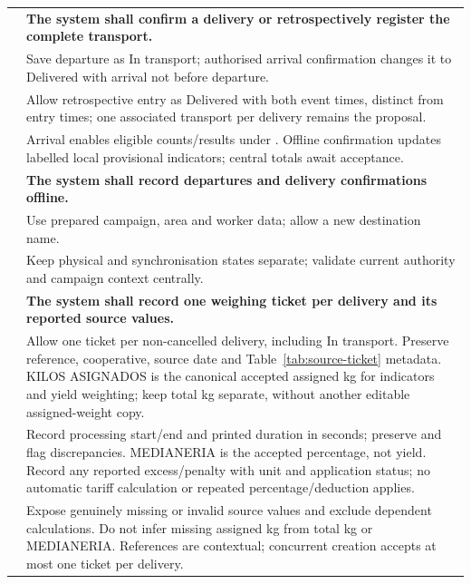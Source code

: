 {\begin{longtable}{L{0.18}L{0.82}}
\midrule
{}
\label{fr:047}\textbf{} & \textbf{The system shall confirm a delivery or retrospectively register the complete transport.}\\*
\label{ac:047:a} & Save departure as In transport; authorised arrival confirmation changes it to Delivered with arrival not before departure.\\
\label{ac:047:b} & Allow retrospective entry as Delivered with both event times, distinct from entry times; one associated transport per delivery remains the proposal.\\
\label{ac:047:c} & Arrival enables eligible counts/results under . Offline confirmation updates labelled local provisional indicators; central totals await acceptance.\\
\midrule
{}
\label{fr:048}\textbf{} & \textbf{The system shall record departures and delivery confirmations offline.}\\*
\label{ac:048:a} & Use prepared campaign, area and worker data; allow a new destination name.\\
\label{ac:048:b} & Keep physical and synchronisation states separate; validate current authority and campaign context centrally.\\
\midrule
{}
\label{fr:049}\textbf{} & \textbf{The system shall record one weighing ticket per delivery and its reported source values.}\\*
\label{ac:049:a} & Allow one ticket per non-cancelled delivery, including In transport. Preserve reference, cooperative, source date and Table~\ref{tab:source-ticket} metadata. KILOS ASIGNADOS is the canonical accepted assigned kg for indicators and yield weighting; keep total kg separate, without another editable assigned-weight copy.\\
\label{ac:049:b} & Record processing start/end and printed duration in seconds; preserve and flag discrepancies. MEDIANERIA is the accepted percentage, not yield. Record any reported excess/penalty with unit and application status; no automatic tariff calculation or repeated percentage/deduction applies.\\
\label{ac:049:c} & Expose genuinely missing or invalid source values and exclude dependent calculations. Do not infer missing assigned kg from total kg or MEDIANERIA. References are contextual; concurrent creation accepts at most one ticket per delivery.\\

\end{longtable}}
